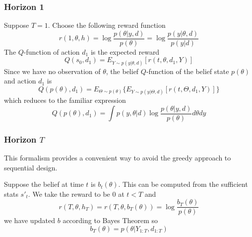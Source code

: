 \subsubsection{Horizon 1}
Suppose $T=1$. Choose the following reward function
\begin{equation}
r(1, \theta, h) = \log \frac{p(\theta | y, d)}{p(\theta)} = \log \frac{p(y | \theta, d)}{p(y|d)}
\end{equation}
The $Q$-function of action $d_1$ is the expected reward
\begin{equation}
	Q(s_0, d_1) = E_{Y \sim p(y|\theta, d)}[r(t, \theta, d_1, Y)]
\end{equation}
Since we have no observation of $\theta$, the belief $Q$-function of the belief state $p(\theta)$ and action $d_1$ is
\begin{equation}
	Q(p(\theta), d_1) = E_{\Theta \sim p(\theta)}\{E_{Y \sim p(y|\Theta, d)}[r(t, \Theta, d_1, Y)]\}
\end{equation}
which reduces to the familiar expression
\begin{equation}
	Q(p(\theta), d_1) = \int p(y, \theta | d) \log \frac{p(\theta | y, d)}{p(\theta)} d\theta dy
\end{equation}

\subsubsection{Horizon $T$}
This formalism provides a convenient way to avoid the greedy approach to sequential design.

Suppose the belief at time $t$ is $b_t(\theta)$. This can be computed from the sufficient stats $s'_t$. We take the reward to be $0$ at $t<T$ and
\begin{equation}
	r(T, \theta, h_T) = r(T, \theta, b_T(\theta)) = \log \frac{b_T(\theta) }{p(\theta)}
\end{equation}
we have updated $b$ according to Bayes Theorem so
\begin{equation}
	b_T(\theta) = p(\theta | Y_{1:T}, d_{1:T})
\end{equation}